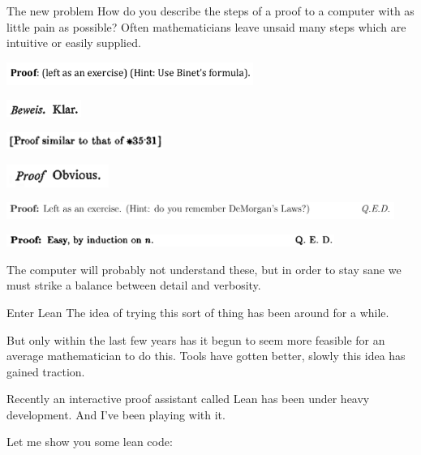 \begin{frame}{The new problem}
    How do you describe the steps of a proof to a computer with as little pain as possible? \pause
    Often mathematicians leave unsaid many steps which are intuitive or easily supplied. \pause

    \includegraphics[height=2em]{pf-exercise.png}\pause

    \includegraphics[height=1.5em]{beweis-klar.png}\pause

    \includegraphics[height=1.5em]{pf-similar.png}\pause

    \includegraphics[height=2em]{pf-obvious.png}\pause

    \includegraphics[height=1.5em]{pf-remember.png}\pause

    \includegraphics[height=1.1em]{pf-easy-induct.png}\pause

    The computer will probably not understand these, but in order to stay sane we must strike a balance between detail and verbosity.
\end{frame}

\begin{frame}{Enter Lean}
    The idea of trying this sort of thing has been around for a while. \pause

    But only within the last few years has it begun to seem more feasible for an average mathematician to do this. Tools have gotten better, slowly this idea has gained traction.\pause

    Recently an interactive proof assistant called Lean has been under heavy development. And I've been playing with it.

    Let me show you some lean code:
\end{frame}

